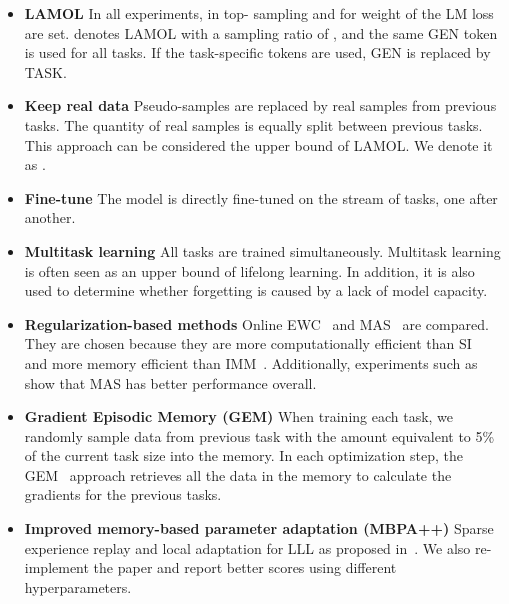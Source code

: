\documentclass{article} \usepackage{iclr2020_conference,times}
\begin{document}
\begin{itemize}[leftmargin=*]

    \item \textbf{LAMOL} In all experiments,  in top- sampling and  for weight of the LM loss are set.
 denotes LAMOL with a sampling ratio of , and the same GEN token is used for all tasks.
If the task-specific tokens are used, GEN is replaced by TASK.

    \item \textbf{Keep real data} Pseudo-samples are replaced by real samples from previous tasks. 
The quantity of real samples is equally split between previous tasks.
This approach can be considered the upper bound of LAMOL.
We denote it as .

    \item \textbf{Fine-tune}
The model is directly fine-tuned on the stream of tasks, one after another.


    \item \textbf{Multitask learning} All tasks are trained simultaneously.
Multitask learning is often seen as an upper bound of lifelong learning.
In addition, it is also used to determine whether forgetting is caused by a lack of model capacity.

    \item \textbf{Regularization-based methods}
Online EWC~\citep{schwarz2018progress} and MAS~\citep{aljundi2018memory} are compared.
They are chosen because they are more computationally efficient than SI~\citep{zenke2017continual} and more memory efficient than 
IMM~\citep{lee2017overcoming}.
Additionally, experiments such as~\cite{elhoseiny2018exploring} show that MAS has better performance overall.

    \item \textbf{Gradient Episodic Memory (GEM)} When training each task, we randomly sample data from previous task with the amount equivalent to 5\% of the current task size into the memory. In each optimization step, the GEM~\citep{lopez2017gradient} approach retrieves all the data in the memory to calculate the gradients for the previous tasks.

    \item \textbf{Improved memory-based parameter adaptation (MBPA++)} Sparse experience replay and local adaptation for LLL as proposed in~\citet{d2019episodic}. We also re-implement the paper and report better scores using different hyperparameters.

\end{itemize}
\end{document}
